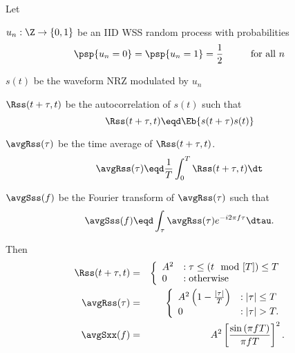 \begin{theorem}
\label{thm:NRZ_stat}
Let
\begin{liste}
   \item $u_n:\Z\to\{0,1\}$ be an IID WSS random process with probabilities 
         \[ \psp\{u_n=0\}=\psp\{u_n=1\}= \frac{1}{2} \hspace{1cm}\mbox{for all $n$}\]
   \item $s(t)$ be the waveform NRZ modulated by $u_n$
   \item $\Rss(t+\tau,t)$ be the autocorrelation of $s(t)$ such that
         \[ \Rss(t+\tau,t) \eqd \Eb{s(t+\tau)s(t)}\]
   \item $\avgRss(\tau)$ be the time average of $\Rss(t+\tau,t)$.
         \[ \avgRss(\tau) \eqd \frac{1}{T}\int_0^T \Rss(t+\tau,t) \dt \]
   \item $\avgSss(f)$ be the Fourier transform of $\avgRss(\tau)$ such that
         \[ \avgSss(f) \eqd \int_\tau \avgRss(\tau) e^{-i2\pi f\tau} \dtau.\]
\end{liste}

Then 
\begin{eqnarray*}
   \Rss(t+\tau,t) 
     &=& \left\{
         \begin{array}{ll}
            A^2 &:\tau \le (t\mod[T])\le T \\
            0 & :\mbox{otherwise}
         \end{array}
         \right.
\\
   \avgRss(\tau) 
     &=& \left\{
         \begin{array}{ll}
            A^2\left( 1- \frac{|\tau|}{T}\right) &:|\tau|\le T \\
            0 & :|\tau|>T.
         \end{array}
         \right.
\\
   \avgSxx(f) 
     &=& A^2 \left[ \frac{\sin\left(\pi fT\right)}{\pi fT}\right]^2.
\end{eqnarray*}
\end{theorem}


